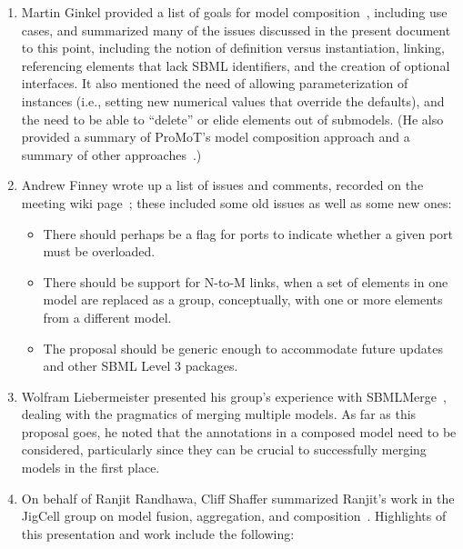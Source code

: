 \begin{enumerate}

\item Martin Ginkel provided a list of goals for model
  composition~\cite{}, including use cases, and summarized many of the
  issues discussed in the present document to this point, including the
  notion of definition versus instantiation, linking, referencing
  elements that lack SBML identifiers, and the creation of optional
  interfaces.  It also mentioned the need of allowing parameterization
  of instances (i.e., setting new numerical values that override the
  defaults), and the need to be able to ``delete'' or elide elements out
  of submodels.  (He also provided a summary of ProMoT's model
  composition approach and a summary of other approaches~\cite{}.)

\item Andrew Finney wrote up a list of issues and comments, recorded
  on the meeting wiki page~\cite{}; these included some old issues as
  well as some new ones:

  \begin{itemize}

  \item There should perhaps be a flag for ports to indicate whether a
    given port must be overloaded.

  \item There should be support for N-to-M links, when a set of elements
    in one model are replaced as a group, conceptually, with one or more
    elements from a different model.

  \item The proposal should be generic enough to accommodate future
    updates and other SBML Level 3 packages.

  \end{itemize}
  
  \item Wolfram Liebermeister presented his group's experience with
    SBMLMerge~\cite{}, dealing with the pragmatics of merging multiple
    models.  As far as this proposal goes, he noted that the annotations
    in a composed model need to be considered, particularly since they
    can be crucial to successfully merging models in the first place.

  \item On behalf of Ranjit Randhawa, Cliff Shaffer summarized Ranjit's
    work in the JigCell group on model fusion, aggregation, and
    composition~\cite{}.  Highlights of this presentation and work
    include the following:


\end{enumerate}
